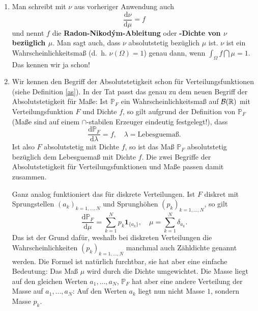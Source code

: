 \begin{bem}
	\begin{enumerate}[label=(\roman*)]
		\item Man schreibt mit $\nu$ aus vorheriger Anwendung auch \[ \frac{\mathrm{d}\nu}{\mathrm{d}\mu} = f \] und nennt $f$ die \textbf{Radon-Nikodým-Ableitung} oder \textbf{-Dichte von $\nu$ bez\"uglich $\mu$}. Man sagt auch, dass $\nu$ absolutstetig bez\"uglich $\mu$ ist. $\nu$ ist ein Wahrscheinlichkeitsmaß (\mbox{d. h.} $\nu(\Omega)=1$) genau dann, wenn $\int_{\Omega} f \dint \mu = 1$. Das kennen wir ja schon!
		
		\item Wir kennen den Begriff der Absolutstetigkeit schon f\"ur Verteilungsfunktionen (siehe Definition \ref{as}). In der Tat passt das genau zu dem neuen Begriff der Absolutstetigkeit f\"ur Ma\ss e: Ist $\mathbb{P}_F$ ein Wahrscheinlichkeitsmaß auf $\mathcal{B}(\mathbb{R})$ mit Verteilungsfunktion $F$ und Dichte $f$, so gilt aufgrund der Definition von $\mathbb{P}_F$ (Ma\ss e sind auf einem $\cap$-stabilen Erzeuger eindeutig festgelegt!), dass $$\frac{\mathrm{d}\mathbb{P}_F}{\mathrm{d}\lambda} = f,\quad \lambda=\text{Lebesguema\ss}.$$ Ist also $F$ absolutstetig mit Dichte $f$, so ist das Ma\ss{} $\mathbb{P}_F$ absolutstetig bez\"uglich dem Lebesguema\ss{} mit Dichte $f$. Die zwei Begriffe der Absolutstetigkeit f\"ur Verteilungsfunktionen und Ma\ss e passen damit zusammen.\smallskip		
		
		 Ganz analog funktioniert das f\"ur diskrete Verteilungen. Ist $F$ diskret mit Sprungstellen $(a_k)_{k=1,...,N}$ und Sprungh\"ohen $(p_k)_{k=1,...,N}$, so gilt
		$$\frac{\mathrm{d}\mathbb{P}_F}{\mathrm{d}\mu} = \sum_{k=1}^N p_k \mathbf 1_{\{a_k\}},\quad \mu=\sum_{k=1}^N \delta_{a_k}.$$
		Das ist der Grund daf\"ur, weshalb bei diskreten Verteilungen die Wahrscheinlichkeiten $(p_k)_{k=1,...,N}$ manchmal auch Z\"ahldichte genannt werden.		
		Die Formel ist nat\"urlich furchtbar, sie hat aber eine einfache Bedeutung: Das Ma\ss{} $\mu$ wird durch die Dichte \glqq umgewichtet\grqq. Die Masse liegt auf den gleichen Werten $a_1,...,a_N$, $\mathbb P_F$ hat aber eine andere Verteilung der Masse auf $a_1,...,a_N$: Auf den Werten $a_k$ liegt nun nicht Masse $1$, sondern Masse $p_k$.
		
		
			\end{enumerate}
\end{bem}


\marginpar{\textcolor{red}{Vorlesung 12}}

